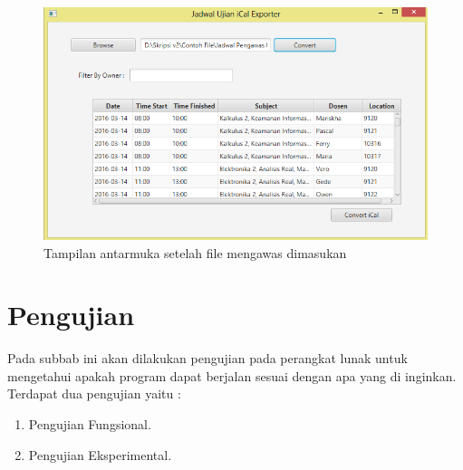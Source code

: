 \begin{enumerate}
		\begin{figure}[H]
		\centering
		\includegraphics[scale=0.7]{Gambar/implementAntarmuka2}
		\caption{Tampilan antarmuka setelah file mengawas dimasukan}
		\label{fig:implementAntarmuka}
		\end{figure}
\end{enumerate}

\section{Pengujian}
Pada subbab ini akan dilakukan pengujian pada perangkat lunak untuk mengetahui apakah program dapat berjalan sesuai dengan apa yang di inginkan. Terdapat dua pengujian yaitu :
\begin{enumerate}
	\item Pengujian Fungsional.
	\item Pengujian Eksperimental.
\end{enumerate}

